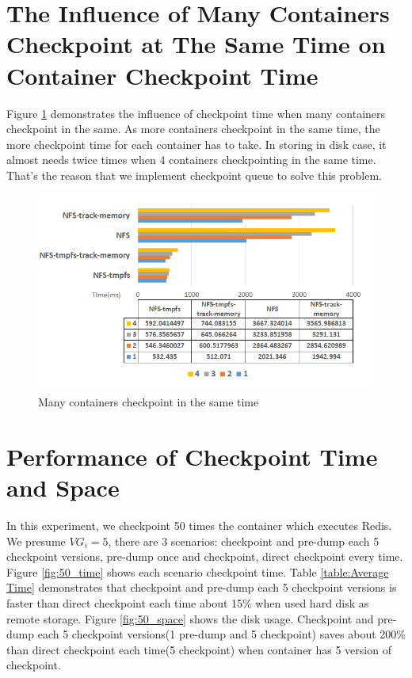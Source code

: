 \section{The Influence of Many Containers Checkpoint at The Same Time on Container Checkpoint Time}
Figure \ref{fig:many containers} demonstrates the influence of checkpoint time when many containers checkpoint in the same.
As more containers checkpoint in the same time, the more checkpoint time for each container has to take.
In storing in disk case, it almost needs twice times when 4 containers checkpointing in the same time. That's the reason that we implement checkpoint queue to solve this problem.

\begin{figure}[htbp]
\begin{center}
\includegraphics[width=14cm]{figure/many_containers.png}
\end{center}
\caption{Many containers checkpoint in the same time}
\label{fig:many containers}
\end{figure}

\section{Performance of Checkpoint Time and Space}
In this experiment, we checkpoint 50 times the container which executes Redis.  We presume $ VG_i = 5 $, there are 3 scenarios: checkpoint and pre-dump each 5 checkpoint versions, pre-dump once and checkpoint, direct checkpoint every time.  Figure \ref{fig:50_time} shows each scenario checkpoint time.  Table \ref{table:Average Time} demonstrates that checkpoint and pre-dump each 5 checkpoint versions is faster than direct checkpoint each time about 15\% when used hard disk as remote storage.  Figure \ref{fig:50_space} shows the disk usage.  Checkpoint and pre-dump each 5 checkpoint versions(1 pre-dump and 5 checkpoint) saves about 200\% than direct checkpoint each time(5 checkpoint) when container has 5 version of checkpoint.

